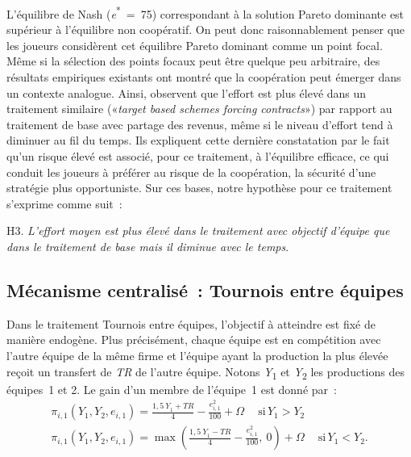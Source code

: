 \begin{Article}
\begin{refsection}[Lebourges]
\begin{appendices}
L'équilibre de Nash (\emph{e}\textsuperscript{*}~=~75) correspondant à
la solution Pareto dominante est supérieur à l'équilibre non coopératif.
On peut donc raisonnablement penser que les joueurs considèrent cet
équilibre Pareto dominant comme un point focal. Même si la sélection des
points focaux peut être quelque peu arbitraire, des résultats empiriques
existants ont montré que la coopération peut émerger dans un contexte
analogue. Ainsi, \textcite{NalbantianSchotter1997} observent que
l'effort est plus élevé dans un traitement similaire («\emph{target
based schemes forcing contracts}») par rapport au traitement de base
avec partage des revenus, même si le niveau d'effort tend à diminuer au
fil du temps. Ils expliquent cette dernière constatation par le fait
qu'un risque élevé est associé, pour ce traitement, à l'équilibre
efficace, ce qui conduit les joueurs à préférer au risque de la
coopération, la sécurité d'une stratégie plus opportuniste. Sur ces
bases, notre hypothèse pour ce traitement s'exprime comme suit~:

\vspace{0,2cm}
H3. \emph{L'effort moyen est plus élevé dans le traitement avec objectif
d'équipe que dans le traitement de base mais il diminue avec le temps}.

\subsection{Mécanisme centralisé~: Tournois entre équipes}

Dans le traitement Tournois entre équipes, l'objectif à atteindre est
fixé de manière endogène. Plus précisément, chaque équipe est en
compétition avec l'autre équipe de la même firme et l'équipe ayant la
production la plus élevée reçoit un transfert de \emph{TR} de l'autre
équipe. Notons \emph{Y}\textsubscript{1} et \emph{Y}\textsubscript{2}
les productions des équipes~1 et 2. Le gain d'un membre de l'équipe~1
est donné par~:
\begin{gather}
\pi_{i,1}\left( Y_{1},Y_{2},e_{i,1} \right) = \frac{{1,5\ Y}_{1} + TR}{4} - \frac{e_{i,1}^{2}}{100} + \Omega\
\quad \text{si} \hspace{2pt} Y_{1} > Y_{2} \nonumber \\
\pi_{i,1}\left( Y_{1},Y_{2},e_{i,1} \right) = \max\left( \frac{{1,5\ Y}_{1} - TR}{4} - \frac{e_{i,1}^{2}}{100},\ 0 \right) + \Omega\
\quad \text{si} \hspace{2pt} Y_{1} < Y_{2}.
\end{gather}


\end{appendices}
\end{refsection}
\end{Article}

